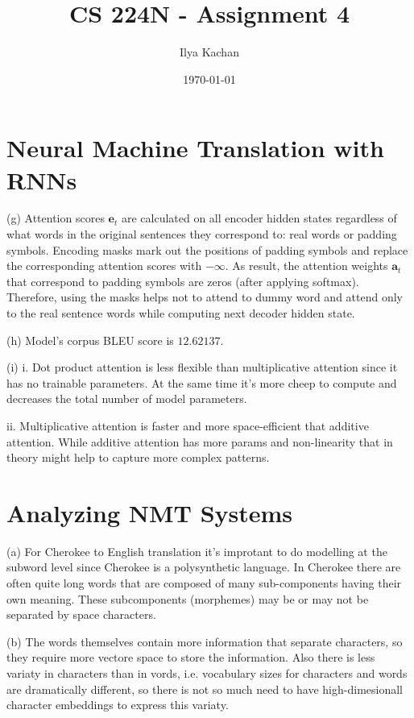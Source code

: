 \documentclass[12pt]{article}
\title{CS 224N - Assignment 4}
\author{Ilya Kachan}
\date{\today}
\begin{document}
\maketitle

\section{Neural Machine Translation with RNNs}

\noindent (g) Attention scores $\mathbf{e}_t$ are calculated on all encoder hidden states regardless of what words in the original sentences they correspond to: real words or padding symbols. Encoding masks mark out the positions of padding symbols and replace the corresponding attention scores with $-\infty$. As result, the attention weights $\mathbf{a}_t$ that correspond to padding symbols are zeros (after applying softmax). Therefore, using the masks helps not to attend to dummy word and attend only to the real sentence words while computing next decoder hidden state.
\smallskip

\noindent (h) Model's corpus BLEU score is $12.62137$.
\smallskip

\noindent (i) i. Dot product attention is less flexible than multiplicative attention since it has no trainable parameters. At the same time it's more cheep to compute and decreases the total number of model parameters.

ii. Multiplicative attention is faster and more space-efficient that additive attention. While additive attention has more params and non-linearity that in theory might help to capture more complex patterns.
\smallskip

\section{Analyzing NMT Systems}

\noindent (a) For Cherokee to English translation it's improtant to do modelling at the subword level since Cherokee is a polysynthetic language. In Cherokee there are often quite long words that are composed of many sub-components having their own meaning. These subcomponents (morphemes) may be or may not be separated by space characters.
\smallskip

\noindent (b) The words themselves contain more information that separate characters, so they require more vectore space to store the information. Also there is less variaty in characters than in vords, i.e. vocabulary sizes for characters and words are dramatically different, so there is not so much need to have high-dimesionall character embeddings to express this variaty.
\smallskip
\end{document}
